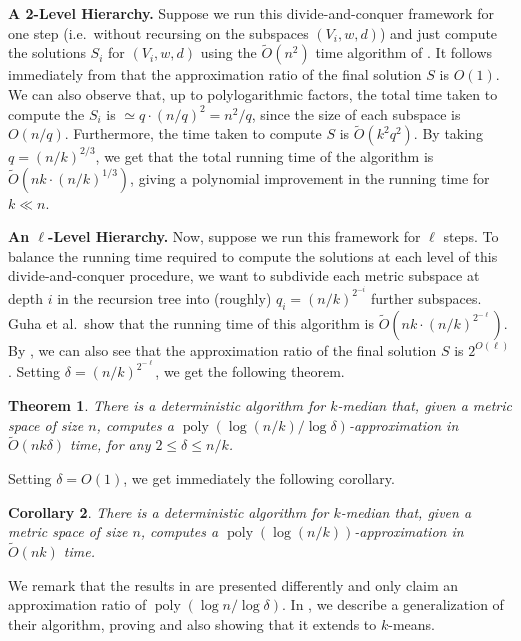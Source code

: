 \documentclass[11pt]{article}
\newcommand{\1}{\mathmybb{1}}
\newtheorem{theorem}{Theorem}[section]
\newtheorem{corollary}[theorem]{Corollary}
\DeclareMathOperator*{\poly}{poly}
\begin{document}
\medskip
\noindent \textbf{A 2-Level Hierarchy.} Suppose we run this divide-and-conquer framework for one step (i.e.~without recursing on the subspaces $(V_i, w, d)$) and just compute the solutions $S_i$ for $(V_i, w, d)$ using the $\tilde O(n^2)$ time algorithm of \cite{MettuP00}. It follows immediately from  that the approximation ratio of the final solution $S$ is $O(1)$. We can also observe that, up to polylogarithmic factors, the total time taken to compute the $S_i$ is $\simeq q \cdot (n/q)^2 = n^2/q$, since the size of each subspace is $O(n/q)$. Furthermore, the time taken to compute $S$ is $\tilde O( k^2q^2)$. By taking $q = (n/k)^{2/3}$, we get that the total running time of the algorithm is $\tilde O(nk \cdot (n/k)^{1/3})$, giving a polynomial improvement in the running time for $k \ll n$.

\medskip
\noindent \textbf{An $\ell$-Level Hierarchy.} Now, suppose we  run this framework for $\ell$ steps. To balance the running time required to compute the solutions at each level of this divide-and-conquer procedure, we want to subdivide each metric subspace at depth $i$ in the recursion tree into (roughly) $q_i = (n/k)^{2^{-i}}$ further subspaces. Guha et al.~show that the running time of this algorithm is $\tilde O(nk \cdot (n/k)^{2^{-\ell}})$. By , we can also see that the approximation ratio of the final solution $S$ is $2^{O(\ell)}$. Setting $\delta = (n/k)^{2^{-\ell}}$, we get the following theorem.
\begin{theorem}\label{thm:intro:guha}
    There is a deterministic algorithm for $k$-median that, given a metric space of size $n$, computes a $\poly(\log(n/k) / \log \delta)$-approximation in $\tilde O(nk\delta)$ time, for any $2 \leq \delta \leq n/k$.
\end{theorem}

Setting $\delta = O(1)$, we get immediately the following corollary.

\begin{corollary}
    There is a deterministic algorithm for $k$-median that, given a metric space of size $n$, computes a $\poly(\log(n/k))$-approximation in $\tilde O(nk)$ time.
\end{corollary}

We remark that the results in \cite{focs/GuhaMMO00} are presented differently and only claim an approximation ratio of $\poly(\log n /\log \delta)$. In , we describe a generalization of their algorithm, proving  and also showing that it extends to $k$-means.
\end{document}

